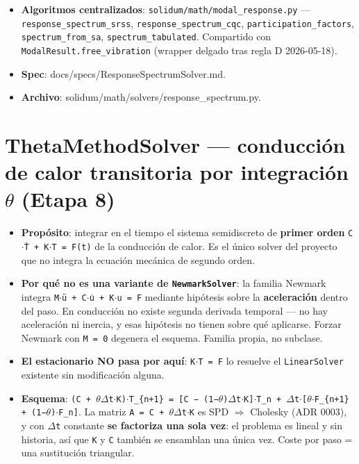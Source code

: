 \documentclass[11pt,letterpaper,oneside]{report}
\begin{document}
\begin{itemize}
  \item \textbf{Algoritmos centralizados}: \texttt{solidum/math/modal\_response.py} --- \texttt{response\_spectrum\_srss}, \texttt{response\_spectrum\_cqc}, \texttt{participation\_factors}, \texttt{spectrum\_from\_sa}, \texttt{spectrum\_tabulated}. Compartido con \texttt{ModalResult.free\_vibration} (wrapper delgado tras regla D 2026-05-18).
  \item \textbf{Spec}: docs/specs/ResponseSpectrumSolver.md.
  \item \textbf{Archivo}: solidum/math/solvers/response\_spectrum.py.
\end{itemize}


\section{ThetaMethodSolver --- conducción de calor transitoria por integración \ensuremath{\theta} (Etapa 8)}

\begin{itemize}
  \item \textbf{Propósito}: integrar en el tiempo el sistema semidiscreto de \textbf{primer orden} \texttt{C\ensuremath{\cdot}Ṫ + K\ensuremath{\cdot}T = F(t)} de la conducción de calor. Es el único solver del proyecto que no integra la ecuación mecánica de segundo orden.
  \item \textbf{Por qué no es una variante de \texttt{NewmarkSolver}}: la familia Newmark integra \texttt{M\ensuremath{\cdot}ü + C\ensuremath{\cdot}u̇ + K\ensuremath{\cdot}u = F} mediante hipótesis sobre la \textbf{aceleración} dentro del paso. En conducción no existe segunda derivada temporal --- no hay aceleración ni inercia, y esas hipótesis no tienen sobre qué aplicarse. Forzar Newmark con \texttt{M = 0} degenera el esquema. Familia propia, no subclase.
  \item \textbf{El estacionario NO pasa por aquí}: \texttt{K\ensuremath{\cdot}T = F} lo resuelve el \texttt{LinearSolver} existente sin modificación alguna.
  \item \textbf{Esquema}: \texttt{(C + \ensuremath{\theta}\ensuremath{\Delta}t\ensuremath{\cdot}K)\ensuremath{\cdot}T\_\{n+1\} = [C − (1−\ensuremath{\theta})\ensuremath{\Delta}t\ensuremath{\cdot}K]\ensuremath{\cdot}T\_n + \ensuremath{\Delta}t\ensuremath{\cdot}[\ensuremath{\theta}\ensuremath{\cdot}F\_\{n+1\} + (1−\ensuremath{\theta})\ensuremath{\cdot}F\_n]}. La matriz \texttt{A = C + \ensuremath{\theta}\ensuremath{\Delta}t\ensuremath{\cdot}K} es SPD \ensuremath{\Rightarrow} Cholesky (ADR 0003), y con \texttt{\ensuremath{\Delta}t} constante \textbf{se factoriza una sola vez}: el problema es lineal y sin historia, así que \texttt{K} y \texttt{C} también se ensamblan una única vez. Coste por paso = una sustitución triangular.
\end{itemize}
\end{document}
